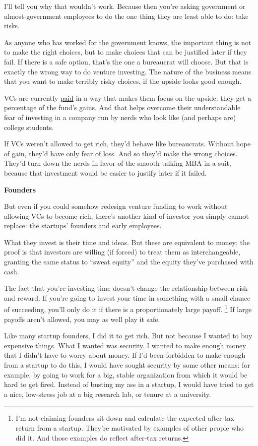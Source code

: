 I'll tell you why that wouldn't work. Because then you're asking
government or almost-government employees to do the one thing they are
least able to do: take risks.

As anyone who has worked for the government knows, the important thing
is not to make the right choices, but to make choices that can be
justified later if they fail. If there is a safe option, that's the one
a bureaucrat will choose. But that is exactly the wrong way to do
venture investing. The nature of the business means that you want to
make terribly risky choices, if the upside looks good enough.

VCs are currently \href{venturecapital.html}{paid} in a way that makes
them focus on the upside: they get a percentage of the fund's gains. And
that helps overcome their understandable fear of investing in a company
run by nerds who look like (and perhaps are) college students.

If VCs weren't allowed to get rich, they'd behave like bureaucrats.
Without hope of gain, they'd have only fear of loss. And so they'd make
the wrong choices. They'd turn down the nerds in favor of the
smooth-talking MBA in a suit, because that investment would be easier to
justify later if it failed.

\textbf{Founders}

But even if you could somehow redesign venture funding to work without
allowing VCs to become rich, there's another kind of investor you simply
cannot replace: the startups' founders and early employees.

What they invest is their time and ideas. But these are equivalent to
money; the proof is that investors are willing (if forced) to treat them
as interchangeable, granting the same status to ``sweat equity'' and the
equity they've purchased with cash.

The fact that you're investing time doesn't change the relationship
between risk and reward. If you're going to invest your time in
something with a small chance of succeeding, you'll only do it if there
is a proportionately large payoff. \footnote{I'm not claiming founders sit down and calculate the expected
after-tax return from a startup. They're motivated by examples of other
people who did it. And those examples do reflect after-tax returns.} If large
payoffs aren't allowed, you may as well play it safe.

Like many startup founders, I did it to get rich. But not because I
wanted to buy expensive things. What I wanted was security. I wanted to
make enough money that I didn't have to worry about money. If I'd been
forbidden to make enough from a startup to do this, I would have sought
security by some other means: for example, by going to work for a big,
stable organization from which it would be hard to get fired. Instead of
busting my ass in a startup, I would have tried to get a nice,
low-stress job at a big research lab, or tenure at a university.

